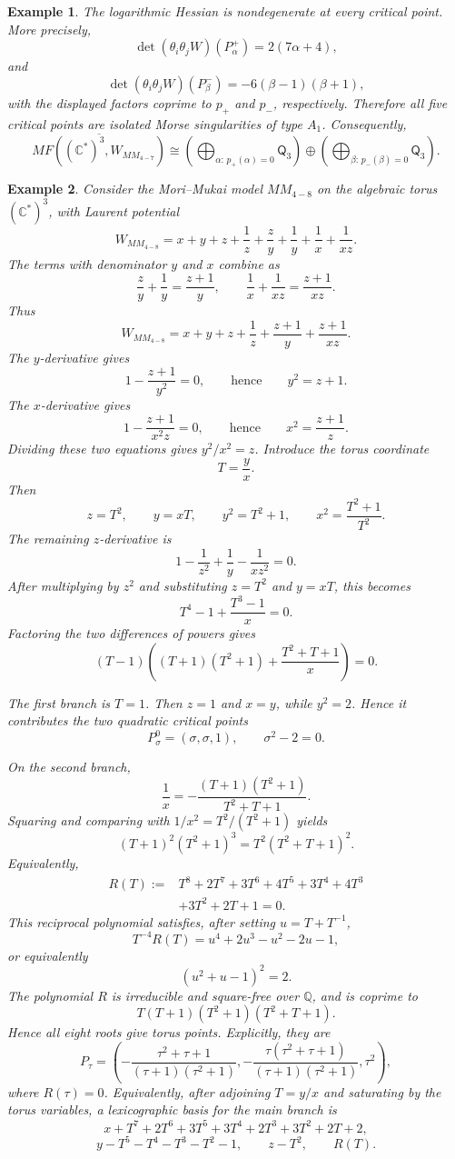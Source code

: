 \documentclass[11pt]{amsart}
\newtheorem{example}{Example}[section]
\newcommand{\MorseCat}[1]{\mathsf{Q}_{#1}}
\begin{document}
\begin{example}
The logarithmic Hessian is nondegenerate at every critical point. More
precisely,
\[
\det(\theta_i\theta_jW)(P^+_\alpha)=2(7\alpha+4),
\]
and
\[
\det(\theta_i\theta_jW)(P^-_\beta)=-6(\beta-1)(\beta+1),
\]
with the displayed factors coprime to $p_+$ and $p_-$, respectively. Therefore
all five critical points are isolated Morse singularities of type $A_1$.
Consequently,
\[
\overline{MF((\mathbb{C}^*)^3,W_{MM_{4-7}})}
\cong \left(\bigoplus_{\alpha:\,p_+(\alpha)=0}\MorseCat{3}\right) \oplus \left(\bigoplus_{\beta:\,p_-(\beta)=0}\MorseCat{3}\right).
\]
\end{example}

\begin{example}
Consider the Mori--Mukai model $MM_{4-8}$ on the algebraic torus
$(\mathbb{C}^*)^3$, with Laurent potential
\[
W_{MM_{4-8}}=x+y+z+\frac{1}{z}+\frac{z}{y}+\frac{1}{y}
+\frac{1}{x}+\frac{1}{xz}.
\]
The terms with denominator $y$ and $x$ combine as
\[
\frac{z}{y}+\frac{1}{y}=\frac{z+1}{y},
\qquad
\frac{1}{x}+\frac{1}{xz}=\frac{z+1}{xz}.
\]
Thus
\[
W_{MM_{4-8}}=x+y+z+\frac{1}{z}+\frac{z+1}{y}
+\frac{z+1}{xz}.
\]
The $y$-derivative gives
\[
1-\frac{z+1}{y^2}=0,
\qquad\text{hence}\qquad
y^2=z+1.
\]
The $x$-derivative gives
\[
1-\frac{z+1}{x^2z}=0,
\qquad\text{hence}\qquad
x^2=\frac{z+1}{z}.
\]
Dividing these two equations gives $y^2/x^2=z$. Introduce the torus coordinate
\[
T=\frac{y}{x}.
\]
Then
\[
z=T^2,
\qquad
y=xT,
\qquad
y^2=T^2+1,
\qquad
x^2=\frac{T^2+1}{T^2}.
\]
The remaining $z$-derivative is
\[
1-\frac{1}{z^2}+\frac{1}{y}-\frac{1}{xz^2}=0.
\]
After multiplying by $z^2$ and substituting $z=T^2$ and $y=xT$, this becomes
\[
T^4-1+\frac{T^3-1}{x}=0.
\]
Factoring the two differences of powers gives
\[
(T-1)\left((T+1)(T^2+1)+\frac{T^2+T+1}{x}\right)=0.
\]

The first branch is $T=1$. Then $z=1$ and $x=y$, while $y^2=2$. Hence it
contributes the two quadratic critical points
\[
P^0_\sigma=(\sigma,\sigma,1),
\qquad
\sigma^2-2=0.
\]

On the second branch,
\[
\frac{1}{x}=-\frac{(T+1)(T^2+1)}{T^2+T+1}.
\]
Squaring and comparing with $1/x^2=T^2/(T^2+1)$ yields
\[
(T+1)^2(T^2+1)^3=T^2(T^2+T+1)^2.
\]
Equivalently,
\[
\begin{aligned}
R(T):={}&T^8+2T^7+3T^6+4T^5+3T^4+4T^3 \\
&+3T^2+2T+1=0.
\end{aligned}
\]
This reciprocal polynomial satisfies, after setting $u=T+T^{-1}$,
\[
T^{-4}R(T)=u^4+2u^3-u^2-2u-1,
\]
or equivalently
\[
(u^2+u-1)^2=2.
\]
The polynomial $R$ is irreducible and square-free over $\mathbb{Q}$, and is
coprime to
\[
T(T+1)(T^2+1)(T^2+T+1).
\]
Hence all eight roots give torus points. Explicitly, they are
\[
P_\tau=\left(
-\frac{\tau^2+\tau+1}{(\tau+1)(\tau^2+1)},
-\frac{\tau(\tau^2+\tau+1)}{(\tau+1)(\tau^2+1)},
\tau^2
\right),
\]
where $R(\tau)=0$.
Equivalently, after adjoining $T=y/x$ and saturating by the torus variables,
a lexicographic basis for the main branch is
\[
x+T^7+2T^6+3T^5+3T^4+2T^3+3T^2+2T+2,
\]
\[
y-T^5-T^4-T^3-T^2-1,
\qquad
z-T^2,
\qquad
R(T).
\]


\end{example}
\end{document}
